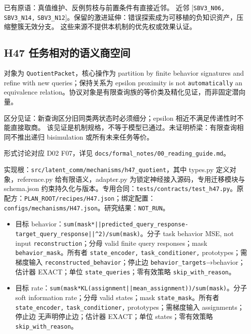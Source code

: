 \documentclass[
  10pt,
]{article}
\begin{document}
已有原语：真值维护、反例剪枝与前置条件有直接近邻。 近邻
{[}\nolinkurl{SBV3_N06,} \nolinkurl{SBV3_N14,}
\nolinkurl{SBV3_N12}{]}。保留的激进延伸：错误探索成为可移植的负知识资产，压缩整簇无效分支。
这些来源不提供本机制的优先权或效果认证。

\subsection{H47
任务相对的语义商空间}\label{h47-ux4efbux52a1ux76f8ux5bf9ux7684ux8bedux4e49ux5546ux7a7aux95f4}

对象为 \nolinkurl{QuotientPacket}，核心操作为 partition by finite
behavior signatures and refine with new queries；保持关系为 epsilon
proximity is not \nolinkurl{automatically} an equivalence
relation。协议对象是有限查询族的等价类及精化见证，而非固定潜向量。

区分见证：新查询区分旧同类两状态时必须细分；epsilon
相近不满足传递性时不能直接取商。
该见证是机制规格，不等于模型已通过。未证明桥梁：有限查询相同不推出递归
bisimulation 或所有未来任务等价。

形式讨论对应 D02 F07，详见
{\small\nolinkurl{docs/formal_notes/00_reading_guide.md}}。

实现根：{\small\nolinkurl{src/latent_comm/mechanisms/h47_quotient}}，其中
types.py 定义对象，reference.py 给有限语义，adapter.py
为锁定神经接入源码，专用迁移模块与 schema.json
约束持久化与版本。专用合同：{\small\nolinkurl{tests/contracts/test_h47.py}}。原配方：{\small\nolinkurl{PLAN_ROOT/recipes/H47.json}}；绑定配置：{\small\nolinkurl{configs/mechanisms/H47.json}}。研究结果：\nolinkurl{NOT_RUN}。

\begin{itemize}
\item
  目标
  behavior：{\small\nolinkurl{sum(mask*||predicted_query_response-target_query_response||^2)/sum(mask)}}。分子
  task behavior MSE, not input \nolinkurl{reconstruction}；分母 valid
  finite query responses；mask \nolinkurl{behavior_mask}。所有者
  \nolinkurl{state_encoder,} \nolinkurl{task_conditioner,}
  prototypes；需梯度输入 \nolinkurl{reconstructed_behavior}；停止边
  \nolinkurl{behavior_targets}→behavior；估计器 EXACT；单位
  \nolinkurl{state_queries}；零有效策略 \nolinkurl{skip_with_reason}。
\item
  目标
  rate：{\small\nolinkurl{sum(mask*KL(assignment||mean_assignment))/sum(mask)}}。分子
  soft information rate；分母 valid states；mask
  \nolinkurl{state_mask}。所有者 \nolinkurl{state_encoder,}
  \nolinkurl{task_conditioner,} prototypes；需梯度输入
  assignments；停止边 无声明停止边；估计器 EXACT；单位
  states；零有效策略 \nolinkurl{skip_with_reason}。
\end{itemize}
\end{document}
